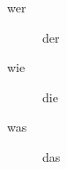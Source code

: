 \documentclass[11pt]{article}
\begin{document}
        \begin{description}
        \item[wer] der
        \item[wie] die
        \item[was] das
    \end{description}
\end{document}
